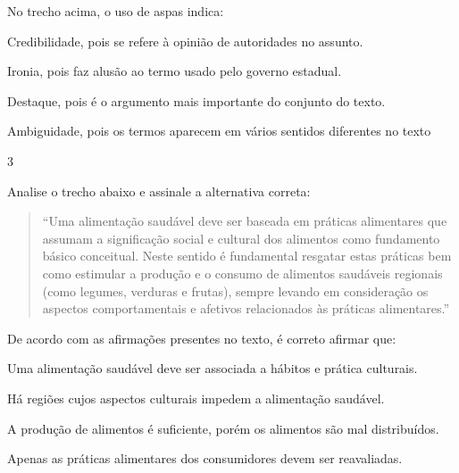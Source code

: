
No trecho acima, o uso de aspas indica:

\begin{escolha}

  \item Credibilidade, pois se refere à opinião de autoridades no assunto.

  \item Ironia, pois faz alusão ao termo usado pelo governo estadual.

  \item Destaque, pois é o argumento mais importante do conjunto do texto.

  \item Ambiguidade, pois os termos aparecem em vários sentidos diferentes no texto

\end{escolha}

\num{3}

Analise o trecho abaixo e assinale a alternativa correta:

\begin{quote}

``Uma alimentação saudável deve ser baseada em práticas alimentares que
assumam a significação social e cultural dos alimentos como fundamento
básico conceitual. Neste sentido é fundamental resgatar estas práticas
bem como estimular a produção e o consumo de alimentos saudáveis
regionais (como legumes, verduras e frutas), sempre levando em
consideração os aspectos comportamentais e afetivos relacionados às
práticas alimentares.''

\end{quote}


De acordo com as afirmações presentes no texto, é correto afirmar que:

\begin{escolha}

  \item Uma alimentação saudável deve ser associada a hábitos e prática culturais.
  
  \item Há regiões cujos aspectos culturais impedem a alimentação saudável.
  
  \item A produção de alimentos é suficiente, porém os alimentos são mal distribuídos.
  
  \item Apenas as práticas alimentares dos consumidores devem ser reavaliadas.

\end{escolha}

